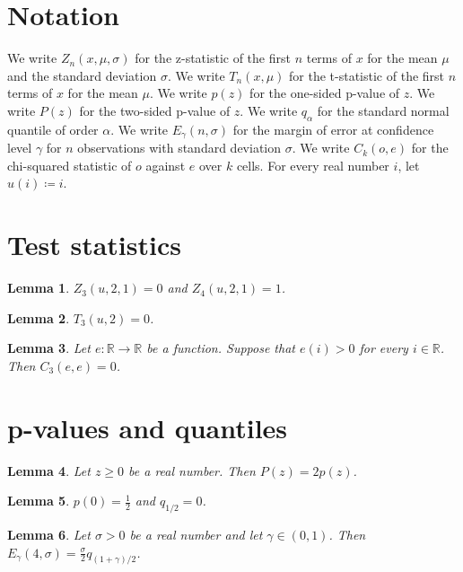 \documentclass{article}
\newtheorem{lemma}{Lemma}
\begin{document}
\section{Notation}

We write $Z_n(x,\mu,\sigma)$ for the z-statistic of the first $n$ terms of $x$ for the mean $\mu$ and the standard deviation $\sigma$.
We write $T_n(x,\mu)$ for the t-statistic of the first $n$ terms of $x$ for the mean $\mu$.
We write $p(z)$ for the one-sided p-value of $z$.
We write $P(z)$ for the two-sided p-value of $z$.
We write $q_\alpha$ for the standard normal quantile of order $\alpha$.
We write $E_\gamma(n,\sigma)$ for the margin of error at confidence level $\gamma$ for $n$ observations with standard deviation $\sigma$.
We write $C_k(o,e)$ for the chi-squared statistic of $o$ against $e$ over $k$ cells.
For every real number $i$, let $u(i)\coloneqq i$.

\section{Test statistics}

\begin{lemma}\label{z}
$Z_3(u,2,1)=0$ and $Z_4(u,2,1)=1$.
\end{lemma}

\begin{lemma}\label{t}
$T_3(u,2)=0$.
\end{lemma}

\begin{lemma}\label{chisquared}
Let $e:\mathbb{R}\to\mathbb{R}$ be a function. Suppose that $e(i)>0$ for every $i\in\mathbb{R}$. Then $C_3(e,e)=0$.
\end{lemma}

\section{p-values and quantiles}

\begin{lemma}\label{pvalue}
Let $z\ge0$ be a real number. Then $P(z)=2p(z)$.
\end{lemma}

\begin{lemma}\label{half}
$p(0)=\frac12$ and $q_{1/2}=0$.
\end{lemma}

\begin{lemma}\label{margin}
Let $\sigma>0$ be a real number and let $\gamma\in(0,1)$. Then $E_\gamma(4,\sigma)=\frac{\sigma}{2}q_{(1+\gamma)/2}$.
\end{lemma}
\end{document}
